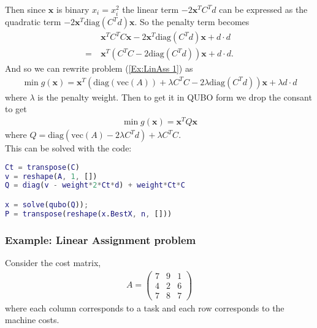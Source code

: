 \documentclass{article}
\begin{document}
\noindent Then since \(\mathbf{x}\) is binary \(x_i = x_i^2\) the linear term \(-2\mathbf{x}^T C^T d\) can be expressed as the quadratic term \(-2\mathbf{x}^T\text{diag}(C^Td)\mathbf{x}\). So the penalty term becomes
\begin{align}
    &\mathbf{x}^T C^T C \mathbf{x} -2\mathbf{x}^T\text{diag}(C^Td)\mathbf{x} + d\cdot d \nonumber \\
    = \: &\mathbf{x}^T(C^T C -2\text{diag}(C^Td))\mathbf{x} + d\cdot d. \label{penalty:CX}
\end{align}
And so we can rewrite problem (\ref{Ex:LinAss 1}) as 
\begin{align*}
    \min g(\mathbf{x}) = \mathbf{x}^T (\text{diag}(\text{vec}(A)) + \lambda C^T C - 2\lambda\text{diag}(C^T d))\mathbf{x} + \lambda d\cdot d
\end{align*}
where \(\lambda\) is the penalty weight. Then to get it in QUBO form we drop the consant to get
\begin{align*}
    \min g(\mathbf{x}) = \mathbf{x}^T Q \mathbf{x}
\end{align*}
where \(Q = \text{diag}(\text{vec}(A) - 2\lambda C^Td) + \lambda C^T C\).\\

\noindent This can be solved with the code:
\begin{lstlisting}[language=MATLAB]
Ct = transpose(C)
v = reshape(A, 1, [])
Q = diag(v - weight*2*Ct*d) + weight*Ct*C

x = solve(qubo(Q));
P = transpose(reshape(x.BestX, n, []))
\end{lstlisting}

\subsubsection{Example: Linear Assignment problem}

Consider the cost matrix, \begin{align*}
    A = \begin{pmatrix}
        7 & 9 & 1\\
        4 & 2 & 6\\
        7 & 8 & 7
    \end{pmatrix}
\end{align*}
where each column corresponds to a task and each row corresponds to the machine costs.
\end{document}
